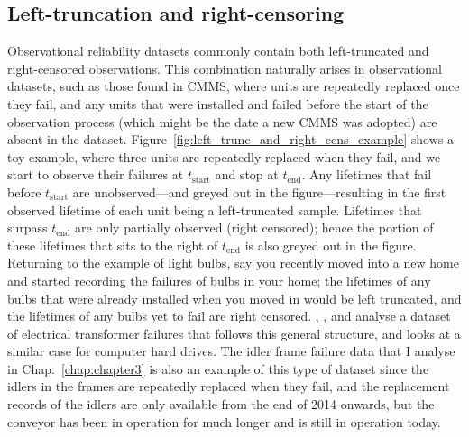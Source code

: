 \subsection{Left-truncation and right-censoring} 

Observational reliability datasets commonly contain both left-truncated and right-censored observations. This combination naturally arises in observational datasets, such as those found in CMMS, where units are repeatedly replaced once they fail, and any units that were installed and failed before the start of the observation process (which might be the date a new CMMS was adopted) are absent in the dataset. Figure~\ref{fig:left_trunc_and_right_cens_example} shows a toy example, where three units are repeatedly replaced when they fail, and we start to observe their failures at $t_{\text{start}}$ and stop at $t_{\text{end}}$. Any lifetimes that fail before $t_{\text{start}}$ are unobserved---and greyed out in the figure---resulting in the first observed lifetime of each unit being a left-truncated sample. Lifetimes that surpass $t_{\text{end}}$ are only partially observed (right censored); hence the portion of these lifetimes that sits to the right of $t_{\text{end}}$ is also greyed out in the figure. Returning to the example of light bulbs, say you recently moved into a new home and started recording the failures of bulbs in your home; the lifetimes of any bulbs that were already installed when you moved in would be left truncated, and the lifetimes of any bulbs yet to fail are right censored. \citet{hong2009}, \citet{mitra2013}, and \citet{kundu2016} analyse a dataset of electrical transformer failures that follows this general structure, and \citet{mittman2013} looks at a similar case for computer hard drives. The idler frame failure data that I analyse in Chap.~\ref{chap:chapter3} is also an example of this type of dataset since the idlers in the frames are repeatedly replaced when they fail, and the replacement records of the idlers are only available from the end of 2014 onwards, but the conveyor has been in operation for much longer and is still in operation today.

